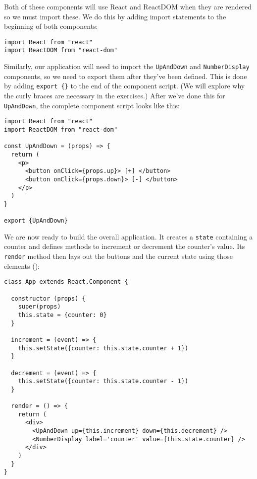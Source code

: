 Both of these components will use React and ReactDOM when they are rendered
so we must import these.
We do this by adding import statements to the beginning of both components:

\begin{verbatim}
import React from "react"
import ReactDOM from "react-dom"
\end{verbatim}

Similarly, our application will need to import the
\texttt{UpAndDown} and \texttt{NumberDisplay} components,
so we need to export them after they've been defined.
This is done by adding \texttt{export\ \{\}} to the end of the
component script.
(We will explore why the curly braces are necessary in the exercises.)
After we've done this for \texttt{UpAndDown},
the complete component script looks like this:

\begin{verbatim}
import React from "react"
import ReactDOM from "react-dom"

const UpAndDown = (props) => {
  return (
    <p>
      <button onClick={props.up}> [+] </button>
      <button onClick={props.down}> [-] </button>
    </p>
  )
}

export {UpAndDown}
\end{verbatim}

We are now ready to build the overall application.
It creates a \texttt{state} containing a counter
and defines methods to increment or decrement the counter's value.
Its \texttt{render} method then lays out the buttons and the current state
using those elements
():

\begin{verbatim}
class App extends React.Component {

  constructor (props) {
    super(props)
    this.state = {counter: 0}
  }

  increment = (event) => {
    this.setState({counter: this.state.counter + 1})
  }

  decrement = (event) => {
    this.setState({counter: this.state.counter - 1})
  }

  render = () => {
    return (
      <div>
        <UpAndDown up={this.increment} down={this.decrement} />
        <NumberDisplay label='counter' value={this.state.counter} />
      </div>
    )
  }
}
\end{verbatim}


